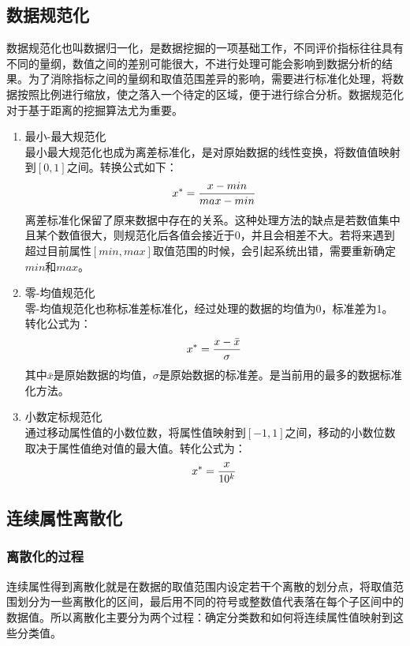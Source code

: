 \documentclass[openany]{progbookcn}
\begin{document}
\subsection{数据规范化}
\indent 数据规范化也叫数据归一化，是数据挖掘的一项基础工作，不同评价指标往往具有不同的量纲，数值之间的差别可能很大，不进行处理可能会影响到数据分析的结果。为了消除指标之间的量纲和取值范围差异的影响，需要进行标准化处理，将数据按照比例进行缩放，使之落入一个待定的区域，便于进行综合分析。数据规范化对于基于距离的挖掘算法尤为重要。
\begin{enumerate}[itemindent=2em]
\item 最小-最大规范化\\
\indent 最小最大规范化也成为离差标准化，是对原始数据的线性变换，将数值值映射到$[0,1]$之间。转换公式如下：
\begin{equation}
x^*={{x-min}\over{max-min}}
\end{equation}
\indent 离差标准化保留了原来数据中存在的关系。这种处理方法的缺点是若数值集中且某个数值很大，则规范化后各值会接近于$0$，并且会相差不大。若将来遇到超过目前属性$[min,max]$取值范围的时候，会引起系统出错，需要重新确定$min$和$max$。
\item 零-均值规范化\\
\indent 零-均值规范化也称标准差标准化，经过处理的数据的均值为0，标准差为1。转化公式为：
\begin{equation}
x^*={{x-{\bar x}}\over{\sigma}}
\end{equation}
\indent 其中${\bar x}$是原始数据的均值，$\sigma$是原始数据的标准差。是当前用的最多的数据标准化方法。
\item 小数定标规范化\\
\indent 通过移动属性值的小数位数，将属性值映射到$[-1,1]$之间，移动的小数位数取决于属性值绝对值的最大值。转化公式为：
\begin{equation}
x^*={{x}\over{10^k}}
\end{equation}
\end{enumerate}
\subsection{连续属性离散化}
\subsubsection{离散化的过程}
\indent 连续属性得到离散化就是在数据的取值范围内设定若干个离散的划分点，将取值范围划分为一些离散化的区间，最后用不同的符号或整数值代表落在每个子区间中的数据值。所以离散化主要分为两个过程：确定分类数和如何将连续属性值映射到这些分类值。
\end{document}
